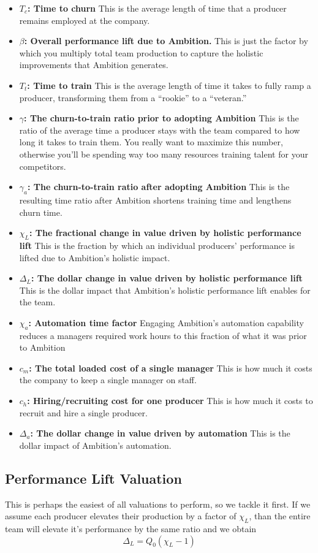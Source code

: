 \documentclass[paper=a4, fontsize=11pt abstract]{scrartcl}
\numberwithin{equation}{section}		%
\numberwithin{figure}{section}			%
\numberwithin{table}{section}				%
\begin{document}
\begin{itemize}
    \item $T_c$\textbf{: Time to churn} This is the average length of time that a producer remains employed at the company.
    \item $\beta$\textbf{: Overall performance lift due to Ambition.} This is just the factor by which you multiply total team production to capture the holistic improvements that Ambition generates. 
    \item $T_t$\textbf{: Time to train} This is the average length of time it takes to fully ramp a producer, transforming them from a ``rookie'' to a ``veteran.'' 
    \item $\gamma$\textbf{: The churn-to-train ratio prior to adopting Ambition} This is the ratio of the average time a producer stays with the team compared to how long it takes to train them.  You really want to maximize this number, otherwise you'll be spending way too many resources training talent for your competitors.
    \item $\gamma_a$\textbf{: The churn-to-train ratio after adopting Ambition} This is the resulting time ratio after Ambition shortens training time and lengthens churn time. 
    \item $\chi_L$\textbf{: The fractional change in value driven by holistic performance lift} This is the fraction by which an individual producers' performance is lifted due to Ambition's holistic impact.
    \item $\Delta_L$\textbf{: The dollar change in value driven by holistic performance lift} This is the dollar impact that Ambition's holistic performance lift enables for the team.
    \item $\chi_a$\textbf{: Automation time factor} Engaging Ambition's automation capability reduces a managers required work hours to this fraction of what it was prior to Ambition
    \item $c_m$\textbf{: The total loaded cost of a single manager} This is how much it costs the company to keep a single manager on staff.
    \item $c_h$\textbf{: Hiring/recruiting cost for one producer} This is how much it costs to recruit and hire a single producer.
    \item $\Delta_a$\textbf{: The dollar change in value driven by automation} This is the dollar impact of Ambition's automation.
\end{itemize}

\subsection{Performance Lift Valuation}
This is perhaps the easiest of all valuations to perform, so we tackle it first.  If we assume each producer elevates their production by a factor of $\chi_L$, than the entire team will elevate it's performance by the same ratio and we obtain
\begin{equation}
    \Delta_L = Q_0\left(\chi_L - 1\right)
\end{equation}
\end{document}
